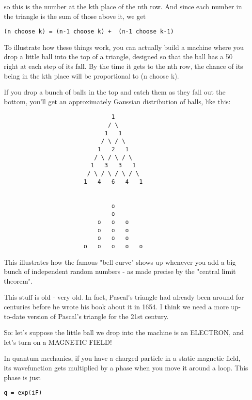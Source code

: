 so this is the number at the kth place of the nth row.  And since
each number in the triangle is the sum of those above it, we get

\begin{verbatim}
(n choose k) = (n-1 choose k) +  (n-1 choose k-1)
\end{verbatim}
    
To illustrate how these things work, you can actually build a machine
where you drop a little ball into the top of a triangle, designed so 
that the ball has a 50%
right at each step of its fall.  By the time it gets to the nth row, the 
chance of its being in the kth place will be proportional to (n choose k).  

If you drop a bunch of balls in the top and catch them as they fall out
the bottom, you'll get an approximately Gaussian distribution of balls,
like this:

\begin{verbatim}
                               1
                              / \
                             1   1
                            / \ / \
                           1   2   1
                          / \ / \ / \
                         1   3   3   1
                        / \ / \ / \ / \
                       1   4   6   4   1


                               o
                               o
                           o   o   o   
                           o   o   o   
                           o   o   o   
                       o   o   o   o   o
\end{verbatim}
    
This illustrates how the famous "bell curve" shows up whenever you 
add a big bunch of independent random numbers - as made precise by
the "central limit theorem".

This stuff is old - very old.  In fact, Pascal's triangle had already
been around for centuries before he wrote his book about it in 1654.  
I think we need a more up-to-date version of Pascal's triangle for the
21st century.

So: let's suppose the little ball we drop into the machine is an
ELECTRON, and let's turn on a MAGNETIC FIELD!

In quantum mechanics, if you have a charged particle in a static
magnetic field, its wavefunction gets multiplied by a phase when 
you move it around a loop.  This phase is just

\begin{verbatim}
q = exp(iF)
\end{verbatim}
    
